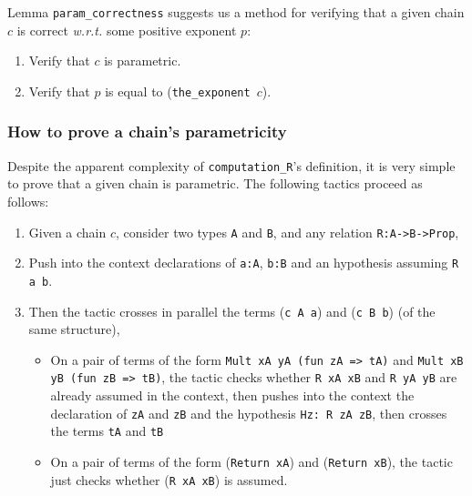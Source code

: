 

Lemma \texttt{param\_correctness} suggests us a method for verifying 
that a given chain $c$ is correct \emph{w.r.t.} some positive exponent $p$:

\begin{enumerate}
\item Verify that $c$ is parametric.
\item Verify that $p$ is equal to (\texttt{the\_exponent $c$}).
\end{enumerate}

\subsubsection{How to prove a chain's parametricity}
Despite the apparent complexity of \texttt{computation\_R}'s definition,
it is very simple to prove that a given chain is parametric. The following tactics
proceed as follows:

\begin{enumerate}
\item Given a chain $c$, consider two types \texttt{A} and
\texttt{B}, and any relation \texttt{R:A->B->Prop}, 
\item Push into the context declarations of \texttt{a:A}, \texttt{b:B}
and an hypothesis assuming \texttt{R a b}.
\item Then the tactic crosses in parallel the terms (\texttt{c A a}) and
(\texttt{c B b}) (of the same structure),
\begin{itemize}
\item On a pair of terms of the form 
\texttt{Mult xA yA (fun zA => tA)} and \linebreak \texttt{Mult xB yB (fun zB => tB)}, the tactic checks whether 
   \texttt{R xA xB} and \texttt{R yA yB} are already assumed in the context,
 then  pushes into the context the declaration of \texttt{zA} and \texttt{zB}
and the hypothesis \linebreak \texttt{Hz: R zA zB}, then crosses the terms \texttt{tA} and
 \texttt{tB}
\item On a pair of terms  of the form   (\texttt{Return xA}) and (\texttt{Return xB}),
 the tactic just checks whether (\texttt{R xA xB}) is assumed.
\end{itemize}

\end{enumerate}

